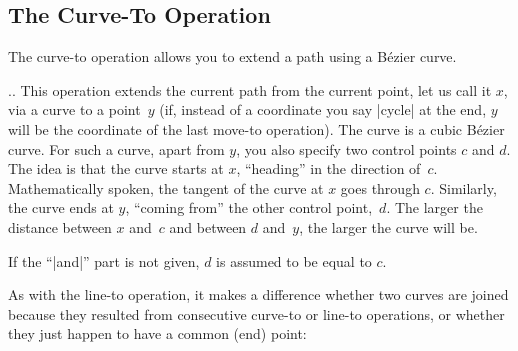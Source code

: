 \subsection{The Curve-To Operation}

The curve-to operation allows you to extend a path using a Bézier curve.

\begin{pathoperation}{..}{}
    This operation extends the current path from the current point, let us call
    it $x$, via a curve to a point~$y$ (if, instead of a coordinate you say
    |cycle| at the end, $y$ will be the coordinate of the last move-to
    operation). The curve is a cubic Bézier curve. For such a curve, apart
    from $y$, you also specify two control points $c$ and $d$. The idea is that
    the curve starts at $x$, ``heading'' in the direction of~$c$.
    Mathematically spoken, the tangent of the curve at $x$ goes through $c$.
    Similarly, the curve ends at $y$, ``coming from'' the other control
    point,~$d$. The larger the distance between $x$ and~$c$ and between $d$
    and~$y$, the larger the curve will be.

    If the ``|and|'' part is not given, $d$ is assumed to be equal to
    $c$.
\begin{codeexample}[]
\end{codeexample}

\begin{codeexample}[]
\end{codeexample}

    As with the line-to operation, it makes a difference whether two curves are
    joined because they resulted from consecutive curve-to or line-to
    operations, or whether they just happen to have a common (end) point:
\begin{codeexample}[]
\end{codeexample}
\end{pathoperation}



